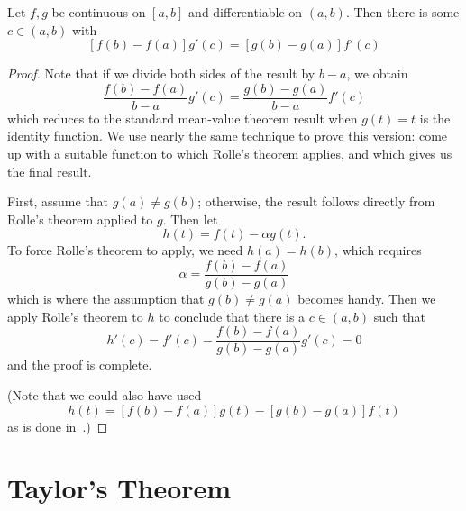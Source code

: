 \begin{theorem}
Let $f,g$ be continuous on $\left[a,b\right]$ and differentiable on $\left(a,b\right)$. Then there is some $c\in \left(a,b\right)$ with $$ \left[f\left(b\right)-f\left(a\right)\right]g'\left(c\right) = \left[g\left(b\right)-g\left(a\right)\right]f'\left(c\right) $$
\end{theorem}
\begin{proof}
Note that if we divide both sides of the result by $b-a$, we obtain $$ \frac{f\left(b\right)-f\left(a\right)}{b-a}g'\left(c\right) = \frac{g\left(b\right)-g\left(a\right)}{b-a}f'\left(c\right) $$ which reduces to the standard mean-value theorem result when $g\left(t\right) = t$ is the identity function. We use nearly the same technique to prove this version: come up with a suitable function to which Rolle's theorem applies, and which gives us the final result.

First, assume that $g\left(a\right) \neq g\left(b\right)$; otherwise, the result follows directly from Rolle's theorem applied to $g$. Then let $$ h\left(t\right) = f\left(t\right) - \alpha g\left(t\right). $$ To force Rolle's theorem to apply, we need $h\left(a\right) = h\left(b\right)$, which requires $$ \alpha = \frac{f\left(b\right)  - f\left(a\right)}{g\left(b\right) - g\left(a\right)} $$ which is where the assumption that $g\left(b\right) \neq g\left(a\right) $ becomes handy. Then we apply Rolle's theorem to $h$ to conclude that there is a $c\in \left(a,b\right)$ such that $$h'\left(c\right) = f'\left(c\right) - \frac{f\left(b\right)-f\left(a\right)}{g\left(b\right)-g\left(a\right)}g'\left(c\right) = 0$$ and the proof is complete.

(Note that we could also have used $$ h\left(t\right) = \left[f\left(b\right)-f\left(a\right)\right]g\left(t\right) - \left[g\left(b\right)-g\left(a\right)\right]f\left(t\right) $$ as is done in~\cite{rudin1964principles}.)
\end{proof}










\section{Taylor's Theorem}

















